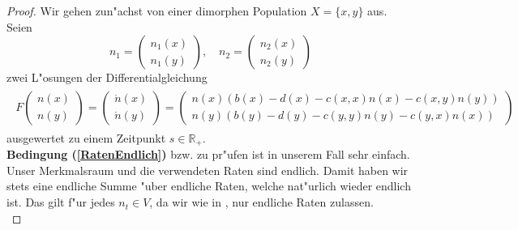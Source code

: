 \documentclass[11pt,a4paper]{article}
\theoremstyle{plain}
\newcommand{\tvec}[2]{\begin{pmatrix}#1\\#2\end{pmatrix}}
\begin{document}
\begin{proof}
	Wir gehen zun"achst von einer dimorphen Population $ X = \{x,y\} $ aus. Seien
	\[ n_1 = \tvec{n_1(x)}{n_1(y)}, \quad n_2 = \tvec{n_2(x)}{n_2(y)} \]
	zwei L"osungen der Differentialgleichung
	\begin{align}
	\begin{split}
	F\tvec{n(x)}{n(y)} = \tvec{\dot{n}(x)}{\dot{n}(y)} =  \tvec{n(x)(b(x)-d(x)-c(x,x)n(x)-c(x,y)n(y))}{n(y)(b(y)-d(y)-c(y,y)n(y)-c(y,x)n(x))}\label{nDGL}
	\end{split}
	\end{align}
	ausgewertet zu einem Zeitpunkt $ s \in \mathbb{R}_{+} $.\\

	\textbf{Bedingung (\ref{RatenEndlich})} bzw. \cite[Kapitel 11 - \textbf{Thm 2.1} (2.6)]{ethier2009markov} zu pr"ufen ist in unserem Fall sehr einfach.
	Unser Merkmalsraum und die verwendeten Raten sind endlich. Damit haben wir stets eine endliche Summe "uber endliche Raten, welche nat"urlich wieder endlich ist. Das gilt f"ur jedes $ n_t \in V $, da wir wie in \cite{fournier2004microscopic}, nur endliche Raten zulassen.\\


\end{proof}
\end{document}
